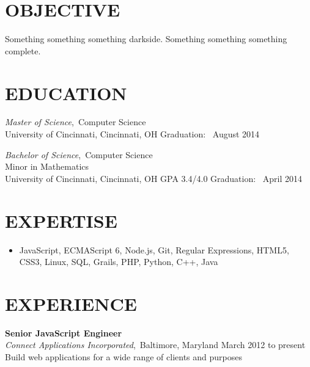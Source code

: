 \documentclass[11pt, line]{res}
\begin{document}
	\address{8228 Melrose Ln\\ Maineville, OH 45039\\ 513-259-0656\\ ross@rhadden.com}

	\begin{resume}
		\vspace{-16pt}
		\section{OBJECTIVE}
			Something something something darkside.  Something something something complete.

		\section{EDUCATION}
				\textit{Master of Science},\, Computer Science \\
				University of Cincinnati, Cincinnati, OH
				\hfill
				Graduation: \ August 2014

			\vspace{-2pt}
				\textit{Bachelor of Science},\, Computer Science \\
				Minor in Mathematics \\
				University of Cincinnati, Cincinnati, OH
				\hspace{16pt}
				GPA 3.4/4.0
				\hfill
				Graduation: \ April 2014

		\section{EXPERTISE}
			\begin{itemize}[leftmargin=0pt]
				\item[]
					JavaScript,
					ECMAScript 6,
					Node.js,
					Git,
					Regular Expressions,
					HTML5,
					CSS3,
					Linux,
					SQL,
					Grails,
					PHP,
					Python,
					C++,
					Java
			\end{itemize}

		\section{EXPERIENCE}
				\textbf{Senior JavaScript Engineer} \\
				\textit{Connect Applications Incorporated},\, Baltimore, Maryland
					\hfill March 2012 to present \\
				Build web applications for a wide range of clients and purposes


\end{resume}
\end{document}
